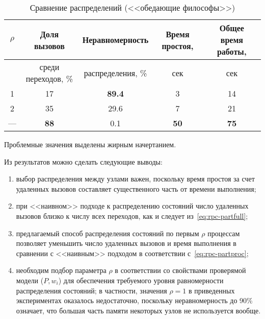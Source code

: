\documentclass[12pt,a4paper,fleqn]{article}
\begin{document}
\begin{table}[htb]
  \centering
  \begin{tabular}{|c|c|c|c|c|}
    \hline
    $\rho$ & Доля вызовов        & Неравномерность   & Время простоя, & Общее время работы, \\ \hline
           & среди переходов, \% & распределения, \% & сек            & сек                 \\ \hline
    1      & 17                  & \textbf{89.4}     & 3              & 14                  \\ \hline
    2      & 35                  & 29.6              & 7              & 21                  \\ \hline
    ---    & \textbf{88}         & 0.1               & \textbf{50}    & \textbf{75}         \\ \hline
  \end{tabular}
  \caption{Сравнение распределений (<<обедающие философы>>)}
  \label{tab:philo-results}
\end{table}

Проблемные значения выделены жирным начертанием.

Из результатов можно сделать следующие выводы:

\begin{enumerate}
\item выбор распределения между узлами важен, поскольку время простоя за счет удаленных вызовов составляет существенного
  часть от времени выполнения;

\item при <<наивном>> подходе к распределению состояний число удаленных вызовов близко к числу всех переходов, как и следует
  из~\eqref{eq:rpc-partfull};

\item предлагаемый способ распределения состояний по первым $\rho$ процессам позволяет уменьшить число удаленных вызовов
  и время выполнения в сравнении с <<наивным>> подходом в соответствии с~\eqref{eq:rpc-partproc};

\item необходим подбор параметра $\rho$ в соответствии со свойствами проверямой модели ($P, w_i$) для обеспечения
  требуемого уровня равномерности распределения состояний; в частности, значения $\rho = 1$ в приведенных экспериментах
  оказалось недостаточно, поскольку неравномерность до 90\% означает, что большая часть памяти некоторых узлов не
  используется вообще.
\end{enumerate}
\end{document}

